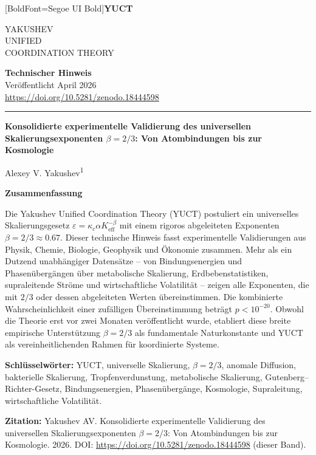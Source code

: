 \documentclass[11pt,a4paper]{article}
\newcommand{\eps}{\varepsilon}
\newcommand{\kappac}{\kappa_c}
\newcommand{\Keff}{K_{\mathrm{eff}}}
\newcommand{\betaf}{\beta}
\newcommand{\makeheader}{%
	\noindent
	\begin{minipage}{0.17\textwidth}
		\raggedright
		{\fontspec{Segoe UI}[BoldFont=Segoe UI Bold]\bfseries\color{skyblue}\fontsize{46}{46}\selectfont YUCT}%
	\end{minipage}%
	\hspace{30pt}
	\begin{minipage}{0.32\textwidth}
		\raggedright
		{\sffamily\fontsize{11}{13}\selectfont YAKUSHEV\\ UNIFIED\\ COORDINATION THEORY}%
	\end{minipage}%
	\hfill
	\begin{minipage}{0.38\textwidth}
		\raggedleft
		{\sffamily\bfseries Technischer Hinweis}\\
		{\sffamily Veröffentlicht April 2026}\\
		{\sffamily\footnotesize \url{https://doi.org/10.5281/zenodo.18444598}}%
	\end{minipage}
	\par\vspace{5pt}
	\noindent\textcolor{gold}{\rule{\textwidth}{1.6pt}}
	\par\vspace{0pt}
}
\begin{document}
	\thispagestyle{firstpage}
	\makeheader
	
	\vspace{0cm}
	{\LARGE\bfseries Konsolidierte experimentelle Validierung des universellen Skalierungsexponenten \(\betaf = 2/3\): Von Atombindungen bis zur Kosmologie \par}
	\vspace{0.2cm}
	
	{\large Alexey V. Yakushev\textsuperscript{1}} \\
	\vspace{0.0cm}
	
	{\color{darkblue}\textbf{\LARGE Zusammenfassung}} \par
	{\large
		\noindent
		Die Yakushev Unified Coordination Theory (YUCT) postuliert ein universelles Skalierungsgesetz \(\eps = \kappac \alpha \Keff^{-\betaf}\) mit einem rigoros abgeleiteten Exponenten \(\betaf = 2/3 \approx 0.67\). Dieser technische Hinweis fasst experimentelle Validierungen aus Physik, Chemie, Biologie, Geophysik und Ökonomie zusammen. Mehr als ein Dutzend unabhängiger Datensätze – von Bindungsenergien und Phasenübergängen über metabolische Skalierung, Erdbebenstatistiken, supraleitende Ströme und wirtschaftliche Volatilität – zeigen alle Exponenten, die mit \(2/3\) oder dessen abgeleiteten Werten übereinstimmen. Die kombinierte Wahrscheinlichkeit einer zufälligen Übereinstimmung beträgt \(p < 10^{-20}\). Obwohl die Theorie erst vor zwei Monaten veröffentlicht wurde, etabliert diese breite empirische Unterstützung \(\betaf = 2/3\) als fundamentale Naturkonstante und YUCT als vereinheitlichenden Rahmen für koordinierte Systeme.}
	
	\vspace{0.1cm}
	\noindent
	{\color{darkblue}\textbf{Schlüsselwörter:}} YUCT, universelle Skalierung, \(\beta = 2/3\), anomale Diffusion, bakterielle Skalierung, Tropfenverdunstung, metabolische Skalierung, Gutenberg–Richter-Gesetz, Bindungsenergien, Phasenübergänge, Kosmologie, Supraleitung, wirtschaftliche Volatilität.
	
	\vspace{0.1cm}
	\noindent
	{\color{darkblue}\textbf{Zitation:}} Yakushev AV. Konsolidierte experimentelle Validierung des universellen Skalierungsexponenten \(\beta = 2/3\): Von Atombindungen bis zur Kosmologie. 2026. DOI: \url{https://doi.org/10.5281/zenodo.18444598} (dieser Band).
	
\end{document}

